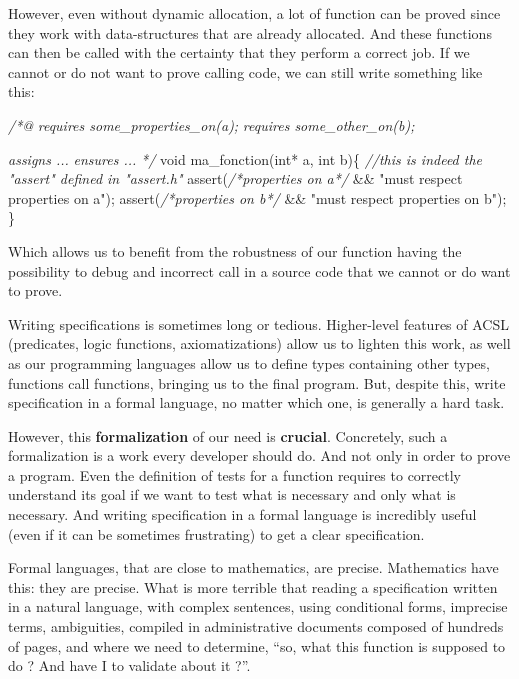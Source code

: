 \documentclass[12pt,francais,]{scrbook}
\newenvironment{Shaded}{}{}
\newcommand{\DataTypeTok}[1]{\textcolor[rgb]{0.56,0.13,0.00}{{#1}}}
\newcommand{\StringTok}[1]{\textcolor[rgb]{0.25,0.44,0.63}{{#1}}}
\newcommand{\CommentTok}[1]{\textcolor[rgb]{0.38,0.63,0.69}{\textit{{#1}}}}
\newcommand{\NormalTok}[1]{{#1}}
\begin{document}
However, even without dynamic allocation, a lot of function can be
proved since they work with data-structures that are already allocated.
And these functions can then be called with the certainty that they
perform a correct job. If we cannot or do not want to prove calling
code, we can still write something like this:

\begin{footnotesize}\begin{Shaded}
\begin{Highlighting}[]
\CommentTok{/*@}
\CommentTok{  requires some_properties_on(a);}
\CommentTok{  requires some_other_on(b);}

\CommentTok{  assigns ...}
\CommentTok{  ensures ...}
\CommentTok{*/}
\DataTypeTok{void} \NormalTok{ma_fonction(}\DataTypeTok{int}\NormalTok{* a, }\DataTypeTok{int} \NormalTok{b)\{}
  \CommentTok{//this is indeed the "assert" defined in "assert.h"}
  \NormalTok{assert(}\CommentTok{/*properties on a*/} \NormalTok{&& }\StringTok{"must respect properties on a"}\NormalTok{);  }
  \NormalTok{assert(}\CommentTok{/*properties on b*/} \NormalTok{&& }\StringTok{"must respect properties on b"}\NormalTok{);}
\NormalTok{\}}
\end{Highlighting}
\end{Shaded}\end{footnotesize}

Which allows us to benefit from the robustness of our function having
the possibility to debug and incorrect call in a source code that we
cannot or do want to prove.

Writing specifications is sometimes long or tedious. Higher-level
features of ACSL (predicates, logic functions, axiomatizations) allow us
to lighten this work, as well as our programming languages allow us to
define types containing other types, functions call functions, bringing
us to the final program. But, despite this, write specification in a
formal language, no matter which one, is generally a hard task.

However, this \textbf{formalization} of our need is \textbf{crucial}.
Concretely, such a formalization is a work every developer should do.
And not only in order to prove a program. Even the definition of tests
for a function requires to correctly understand its goal if we want to
test what is necessary and only what is necessary. And writing
specification in a formal language is incredibly useful (even if it can
be sometimes frustrating) to get a clear specification.

Formal languages, that are close to mathematics, are precise.
Mathematics have this: they are precise. What is more terrible that
reading a specification written in a natural language, with complex
sentences, using conditional forms, imprecise terms, ambiguities,
compiled in administrative documents composed of hundreds of pages, and
where we need to determine, ``so, what this function is supposed to do ?
And have I to validate about it ?''.
\end{document}
